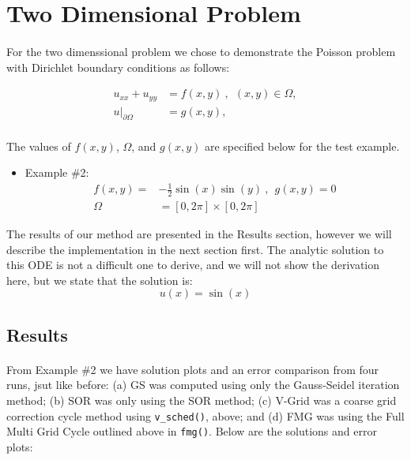 \documentclass[pdftex,12pt,a4paper]{article}
\begin{document}
\section{Two Dimensional Problem}
    \paragraph*{} For the two dimenssional problem we chose to demonstrate the Poisson problem with Dirichlet boundary conditions as follows:
    
    \begin{equation}
    \begin{aligned}
        u_{xx} + u_{yy} &= f(x, y) ~ , ~~ (x, y) \in \Omega, \\
        u|_{\partial \Omega} &= g(x, y), \\
    \end{aligned}
    \end{equation}
    
    The values of $f(x, y)$, $\Omega$, and $g(x, y)$ are specified below for the test example. \\
    \begin{itemize}
        \item Example \#2: 
            \begin{equation*}
            \begin{aligned}
                f(x, y) =& -\frac12\sin(x)\sin(y) ~, ~~ g(x, y) = 0 \\
                \Omega &= [0, 2\pi] \times [0, 2\pi]
            \end{aligned}
            \end{equation*}

    \end{itemize}
    The results of our method are presented in the Results section, however we will describe the implementation in the next section first. The analytic solution to this ODE is not a difficult one to derive, and we will not show the derivation here, but we state that the solution is: $$ u(x) = \sin(x) $$

    \subsection{Results}
        \paragraph*{} From Example \#2 we have solution plots and an error comparison from four runs, jsut like before: (a) GS was computed using only the Gauss-Seidel iteration method; (b) SOR was only using the SOR method; (c) V-Grid was a coarse grid correction cycle method using \lstinline{v_sched()}, above; and (d) FMG was using the Full Multi Grid Cycle outlined above in \lstinline{fmg()}. Below are the solutions and error plots:
\end{document}
